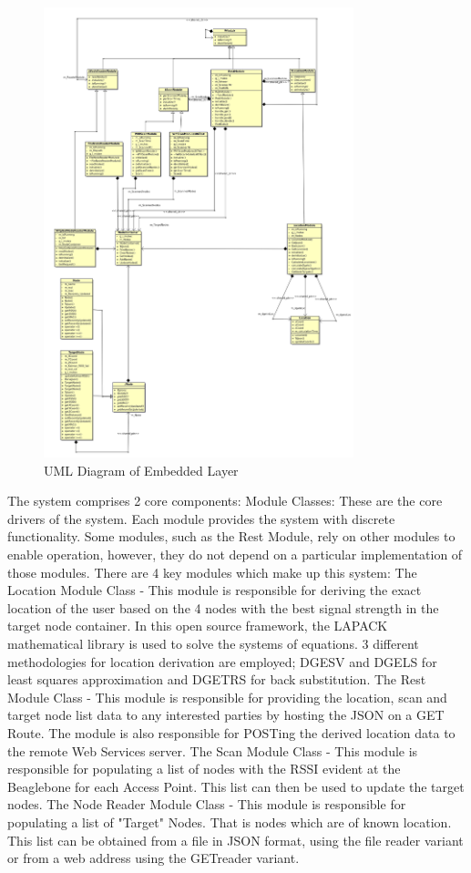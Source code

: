 \documentclass[conference]{IEEEtran}
\begin{document}
\begin{figure}[H]
    \includegraphics[width=9cm,height= 9 cm]{uml_9-5-18.png}
    \caption{UML Diagram of Embedded Layer}
    \end{figure}

The system comprises 2 core components:
\newline
Module Classes: These are the core drivers of the system. Each module provides the system with discrete functionality. Some modules, such as the Rest Module, rely on other modules to enable operation, however, they do not depend on a particular implementation of those modules. \newline
There are 4 key modules which make up this system:
\newline
The Location Module Class - This module is responsible for deriving the exact location of the user based on the 4 nodes with the best signal strength in the target node container. In this open source framework, the LAPACK mathematical library is used to solve the systems of equations. 3 different methodologies for location derivation are employed; DGESV and DGELS for least squares approximation and DGETRS for back substitution.
\newline
The Rest Module Class - This module is responsible for providing the location, scan and target node list data to any interested parties by hosting the JSON on a GET Route. The module is also responsible for POSTing the derived location data to the remote Web Services server.
\newline
The Scan Module Class - This module is responsible for populating a list of nodes with the RSSI evident at the Beaglebone for each Access Point. This list can then be used to update the target nodes.
\newline
The Node Reader Module Class - This module is responsible for populating a list of "Target" Nodes. That is nodes which are of known location. This list can be obtained from a file in JSON format, using the file reader variant or from a web address using the GETreader variant.
\newline
 
\end{document}
